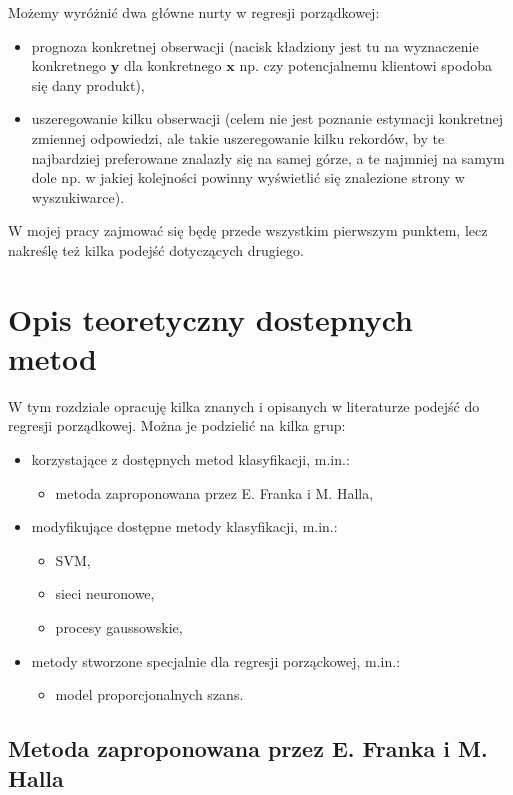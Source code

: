 \documentclass{mini}
\begin{document}
Możemy wyróżnić dwa główne nurty w regresji porządkowej:
\begin{itemize}
	\item prognoza konkretnej obserwacji (nacisk kładziony jest tu na wyznaczenie konkretnego $\textbf{y}$ dla konkretnego $\textbf{x}$ np. czy potencjalnemu klientowi spodoba się dany produkt),
	\item uszeregowanie kilku obserwacji (celem nie jest poznanie estymacji konkretnej zmiennej odpowiedzi, ale takie uszeregowanie kilku rekordów, by te najbardziej preferowane znalazły się na samej górze, a te najmniej na samym dole np. w jakiej kolejności powinny wyświetlić się znalezione strony w wyszukiwarce). 
\end{itemize}

W mojej pracy zajmować się będę przede wszystkim pierwszym punktem, lecz nakreślę też kilka podejść dotyczących drugiego. 


\chapter{Opis teoretyczny dostepnych metod}

W tym rozdziale opracuję kilka znanych i opisanych w literaturze podejść do regresji porządkowej. Można je podzielić na kilka grup:
\begin{itemize}
	\item korzystające z dostępnych metod klasyfikacji, m.in.:
		\begin{itemize}
			\item metoda zaproponowana przez E. Franka i M. Halla,
		\end{itemize}
	\item modyfikujące dostępne metody klasyfikacji, m.in.:
		\begin{itemize}
			\item SVM,
			\item sieci neuronowe,
			\item procesy gaussowskie,
		\end{itemize}
	\item metody stworzone specjalnie dla regresji porząckowej, m.in.:
		\begin{itemize}
			\item model proporcjonalnych szans.
		\end{itemize}
\end{itemize}  

\section{Metoda zaproponowana przez E. Franka i M. Halla}
\end{document}
